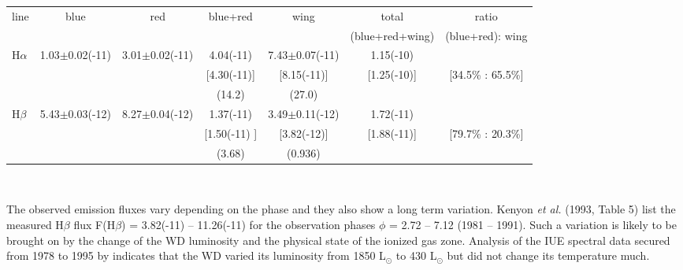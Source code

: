 \documentclass[a4paper,fleqn,usenatbib,useAMS]{mnras}
\def\ha{H{$\alpha$}}
\def\hb{H{$\beta$}}
\def\heii{He\,{\sc ii}}
\def\niii{N\,{\sc iii}}
\begin{document}
\begin{table*}
\caption{Decomposed component fluxes  of the {\ha} and {\hb} lines and corresponding photon numbers.
1.03(-11) means 1.03 $\times 10^{-11}$ erg$^{-1}$ s$^{-1}$ cm$^{-2}$.  The flux values in brackets are interstellar extinction corrected, while the values in parentheses are the corresponding photon numbers per second.
The {\hb} flux measurement was performed while avoiding {\niii} 4858 and {\heii} 4859 lines. The interstellar extinction corrected I({\ha})/I({\hb}) ratio for the (blue+red) flux (in the 4th column) is 2.87. The wide wing fractions for the {\ha} and {\hb} line profiles are 65.5\% and 20.3\%, respectively.
See the text and Fig.~\ref{fig2}. }
\vspace{-0.5cm}
\begin{tabular}{lcccccc}\\
\hline \hline

line & blue & red & blue+red & wing & total      & ratio \\
     &      &     &          &      & (blue+red+wing) & (blue+red): wing \\

\hline
{\ha} & 1.03$\pm$0.02(-11) & 3.01$\pm$0.02(-11)& 4.04(-11) & 7.43$\pm$0.07(-11) & 1.15(-10) & \\
        &                    &    & [4.30(-11)]  & [8.15(-11)]   & [1.25(-10)] & [34.5\% : { 65.5\%}] \\
        &                    &       & (14.2)  & (27.0)        &   &  \\

{\hb}  & 5.43$\pm$0.03(-12) & 8.27$\pm$0.04(-12) & 1.37(-11) & 3.49$\pm$0.11(-12) & 1.72(-11) & \\
        &            &                  &[1.50(-11) ]   & [3.82(-12)] & [1.88(-11)] & [79.7\% : { 20.3\%}] \\
        &                    &           & (3.68)  & (0.936)        &  &  \\

\hline

\end{tabular} \\
\label{tbl}
\end{table*}

The observed emission fluxes vary depending on the phase and they also show a long term variation. Kenyon {\it et al.} (1993, Table 5) list the measured {\hb} flux F({\hb}) =  3.82(-11) -- 11.26(-11) for the observation phases $\phi$ = 2.72 -- 7.12 (1981 -- 1991). Such a variation is likely to be brought on by the change of the WD luminosity and the physical state of the ionized gas zone. Analysis of the IUE spectral data secured from 1978 to 1995 by \citet{alt97} indicates that the WD varied its luminosity from 1850 L$_\odot$ to 430 L$_\odot$ but did not change its temperature much.
\end{document}
